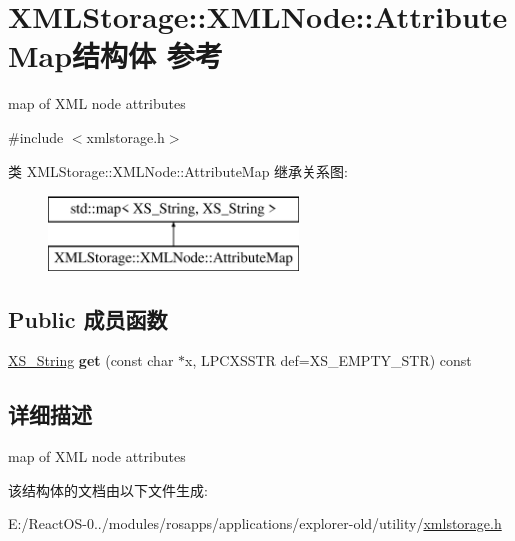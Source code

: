 \hypertarget{struct_x_m_l_storage_1_1_x_m_l_node_1_1_attribute_map}{}\section{X\+M\+L\+Storage\+:\+:X\+M\+L\+Node\+:\+:Attribute\+Map结构体 参考}
\label{struct_x_m_l_storage_1_1_x_m_l_node_1_1_attribute_map}


map of X\+ML node attributes  




{\ttfamily \#include $<$xmlstorage.\+h$>$}

类 X\+M\+L\+Storage\+:\+:X\+M\+L\+Node\+:\+:Attribute\+Map 继承关系图\+:\begin{figure}[H]
\begin{center}
\leavevmode
\includegraphics[height=2.000000cm]{struct_x_m_l_storage_1_1_x_m_l_node_1_1_attribute_map}
\end{center}
\end{figure}
\subsection*{Public 成员函数}
\begin{DoxyCompactItemize}
\item 
\mbox{\label{struct_x_m_l_storage_1_1_x_m_l_node_1_1_attribute_map_ac305dcfbb6a0bc077458d8d9dccf302a}} 
\hyperlink{struct_x_m_l_storage_1_1_x_s___string}{X\+S\+\_\+\+String} {\bfseries get} (const char $\ast$x, L\+P\+C\+X\+S\+S\+TR def=X\+S\+\_\+\+E\+M\+P\+T\+Y\+\_\+\+S\+TR) const
\end{DoxyCompactItemize}


\subsection{详细描述}
map of X\+ML node attributes 

该结构体的文档由以下文件生成\+:\begin{DoxyCompactItemize}
\item 
E\+:/\+React\+O\+S-\/0../modules/rosapps/applications/explorer-\/old/utility/\hyperlink{xmlstorage_8h}{xmlstorage.\+h}\end{DoxyCompactItemize}
